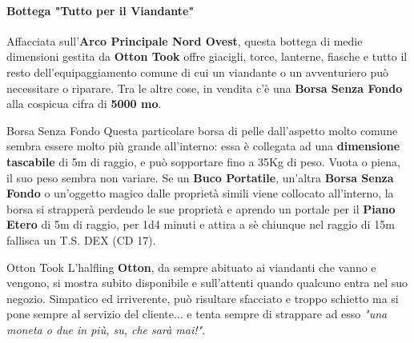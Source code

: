 \documentclass[10pt,twoside,onecolumn,openany]{book}
\begin{document}
\paragraph{Bottega "Tutto per il Viandante"} Affacciata sull'\textbf{Arco Principale Nord Ovest}, questa bottega di medie dimensioni gestita da \textbf{Otton Took} offre giacigli, torce, lanterne, fiasche e tutto il resto dell'equipaggiamento comune di cui un viandante o un avventuriero può necessitare o riparare. Tra le altre cose, in vendita c'è una \textbf{Borsa Senza Fondo} alla cospicua cifra di \textbf{5000 mo}.
\begin{multicols}{2}
\begin{commentbox}{{Borsa Senza Fondo}}
Questa particolare borsa di pelle dall'aspetto molto comune sembra essere molto più grande all'interno: essa è collegata ad una \textbf{dimensione tascabile} di 5m di raggio, e può sopportare fino a 35Kg di peso. Vuota o piena, il suo peso sembra non variare. Se un \textbf{Buco Portatile}, un'altra \textbf{Borsa Senza Fondo} o un'oggetto magico dalle proprietà simili viene collocato all'interno, la borsa si strapperà perdendo le sue proprietà e aprendo un portale per il \textbf{Piano Etero} di 5m di raggio, per 1d4 minuti e attira a sè chiunque nel raggio di 15m fallisca un T.S. DEX (CD 17).
\end{commentbox}
\begin{paperbox}{{Otton Took}}
L'halfling \textbf{Otton}, da sempre abituato ai viandanti che vanno e vengono, si mostra subito disponibile e sull'attenti quando qualcuno entra nel suo negozio. Simpatico ed irriverente, può risultare sfacciato e troppo schietto ma si pone sempre al servizio del cliente... e tenta sempre di strappare ad esso \textit{"una moneta o due in più, su, che sarà mai!"}.
\end{paperbox}
\end{multicols}
\end{document}
